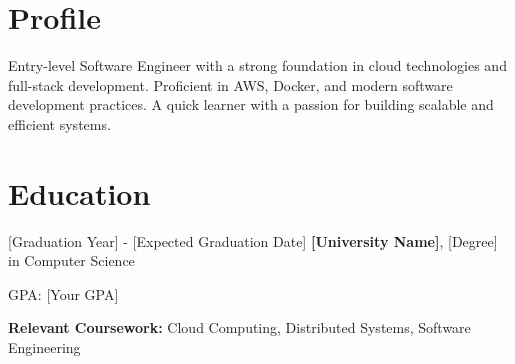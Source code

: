 
    \newcommand{\AND}{\unskip
        \cleaders\copy\ANDbox\hskip\wd\ANDbox
        \ignorespaces
    }
    \newsavebox\ANDbox
    \sbox\ANDbox{$|$}


    \vspace{5 pt - 0.3 cm}

    \section{Profile}

    \begin{onecolentry}
        Entry-level Software Engineer with a strong foundation in cloud technologies and full-stack development. Proficient in AWS, Docker, and modern software development practices. A quick learner with a passion for building scalable and efficient systems.
    \end{onecolentry}

    \section{Education}

    \begin{twocolentry}{
        [Graduation Year] - [Expected Graduation Date]
    }
        \textbf{[University Name]}, [Degree] in Computer Science
    \end{twocolentry}

    \vspace{0.10 cm}
    \begin{onecolentry}
        \begin{highlights}
            \item GPA: [Your GPA]
            \item \textbf{Relevant Coursework:} Cloud Computing, Distributed Systems, Software Engineering
        \end{highlights}
    \end{onecolentry}

